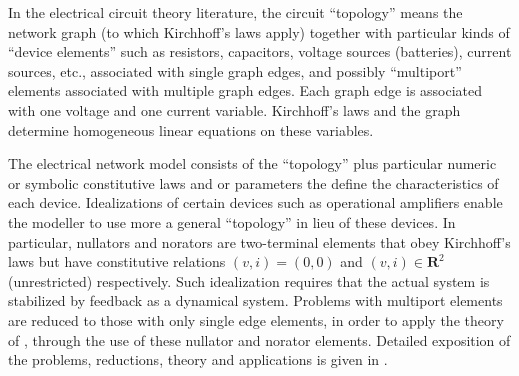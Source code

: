 \documentclass{amsproc-sunycstr}
\def\Reals{\ensuremath{\mathbf R}}
\theoremstyle{plain}
\theoremstyle{definition}
\theoremstyle{remark}
\newcommand{\extra}[1]{{{#1}}}
\begin{document}
\extra{

In the electrical circuit theory literature, the circuit ``topology''
means the network graph (to which Kirchhoff's laws apply)
together with particular kinds of ``device elements''
such as resistors, capacitors, voltage sources (batteries), 
current sources, etc., associated with single graph edges, and possibly
``multiport'' elements associated with multiple graph edges.
Each graph edge is associated with one voltage and one current variable.
Kirchhoff's laws and the graph determine homogeneous
linear equations on these variables.

The electrical network model consists of the ``topology'' plus particular
numeric or symbolic constitutive laws and or parameters the define
the characteristics of each device.  Idealizations of certain devices
such as operational amplifiers enable the modeller to use more a general
``topology'' in lieu of these devices.  
In particular, nullators and norators are two-terminal elements that 
obey Kirchhoff's laws but have constitutive relations 
$(v,i)=(0,0)$ and $(v,i)\in\Reals^2$ (unrestricted) respectively.
Such idealization requires 
that the actual system is stabilized by feedback as a dynamical system.
Problems with multiport elements are reduced to 
those with only single edge elements, in order to apply
the theory of  \cite{HaslerDApplMath},  through the use of 
these nullator and norator elements.  Detailed exposition of the problems,
reductions, theory and applications is given in \cite{HaslerNeirynck}.

}
\end{document}
